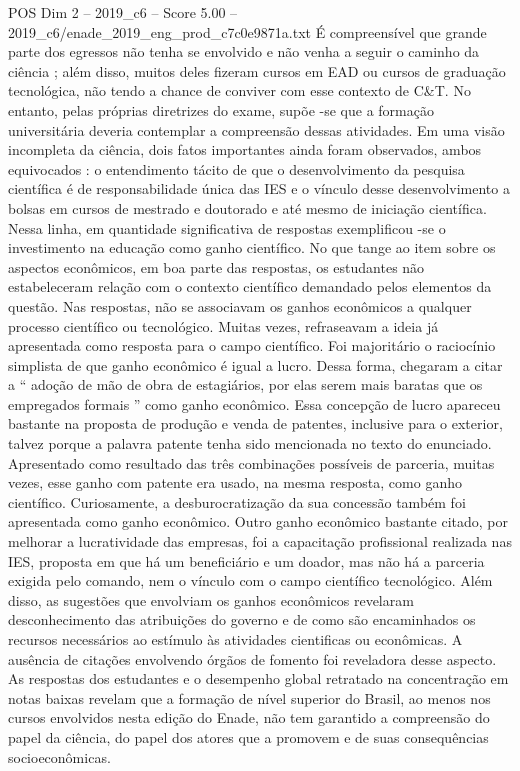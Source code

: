 \begin{textsample}{POS Dim 2 – 2019\_c6 – Score 5.00 – 2019\_c6/enade\_2019\_eng\_prod\_c7c0e9871a.txt}
É compreensível que grande parte dos egressos não tenha se envolvido e não venha a seguir o caminho da ciência ; além disso, muitos deles fizeram cursos em EAD ou cursos de graduação tecnológica, não tendo a chance de conviver com esse contexto de C\&T.
No entanto, pelas próprias diretrizes do exame, supõe -se que a formação universitária deveria contemplar a compreensão dessas atividades.
Em uma visão incompleta da ciência, dois fatos importantes ainda foram observados, ambos equivocados : o entendimento tácito de que o desenvolvimento da pesquisa científica é de responsabilidade única das IES e o vínculo desse desenvolvimento a bolsas em cursos de mestrado e doutorado e até mesmo de iniciação científica.
Nessa linha, em quantidade significativa de respostas exemplificou -se o investimento na educação como ganho científico.
No que tange ao item sobre os aspectos econômicos, em boa parte das respostas, os estudantes não estabeleceram relação com o contexto científico demandado pelos elementos da questão.
Nas respostas, não se associavam os ganhos econômicos a qualquer processo científico ou tecnológico.
Muitas vezes, refraseavam a ideia já apresentada como resposta para o campo científico.
Foi majoritário o raciocínio simplista de que ganho econômico é igual a lucro.
Dessa forma, chegaram a citar a “ adoção de mão de obra de estagiários, por elas serem mais baratas que os empregados formais ” como ganho econômico.
Essa concepção de lucro apareceu bastante na proposta de produção e venda de patentes, inclusive para o exterior, talvez porque a palavra patente tenha sido mencionada no texto do enunciado.
Apresentado como resultado das três combinações possíveis de parceria, muitas vezes, esse ganho com patente era usado, na mesma resposta, como ganho científico.
Curiosamente, a desburocratização da sua concessão também foi apresentada como ganho econômico.
Outro ganho econômico bastante citado, por melhorar a lucratividade das empresas, foi a capacitação profissional realizada nas IES, proposta em que há um beneficiário e um doador, mas não há a parceria exigida pelo comando, nem o vínculo com o campo científico tecnológico.
Além disso, as sugestões que envolviam os ganhos econômicos revelaram desconhecimento das atribuições do governo e de como são encaminhados os recursos necessários ao estímulo às atividades cientificas ou econômicas.
A ausência de citações envolvendo órgãos de fomento foi reveladora desse aspecto.
As respostas dos estudantes e o desempenho global retratado na concentração em notas baixas revelam que a formação de nível superior do Brasil, ao menos nos cursos envolvidos nesta edição do Enade, não tem garantido a compreensão do papel da ciência, do papel dos atores que a promovem e de suas consequências socioeconômicas.

\end{textsample}
